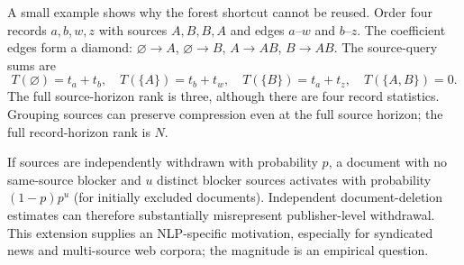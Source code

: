 \documentclass[11pt,a4paper]{article}
\theoremstyle{definition}\newtheorem{definition}[theorem]{Definition}
\begin{document}
A small example shows why the forest shortcut cannot be reused. Order four records $a,b,w,z$ with sources $A,B,B,A$ and edges $a$--$w$ and $b$--$z$. The coefficient edges form a diamond:
$\varnothing\to A$, $\varnothing\to B$, $A\to AB$, $B\to AB$.
The source-query sums are
\[
 T(\varnothing)=t_a+t_b,\quad T(\{A\})=t_b+t_w,
 \quad T(\{B\})=t_a+t_z,\quad T(\{A,B\})=0.
\]
The full source-horizon rank is three, although there are four record statistics. Grouping sources can preserve compression even at the full source horizon; the full record-horizon rank is $N$.

If sources are independently withdrawn with probability $p$, a document with no same-source blocker and $u$ distinct blocker sources activates with probability $(1-p)p^u$ (for initially excluded documents). Independent document-deletion estimates can therefore substantially misrepresent publisher-level withdrawal. This extension supplies an NLP-specific motivation, especially for syndicated news and multi-source web corpora; the magnitude is an empirical question.

\newpage
\end{document}
